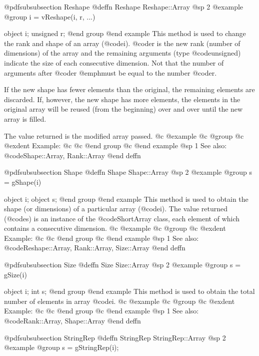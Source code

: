 @pdfsubsubsection {Reshape}
@deffn {Reshape} Reshape::Array
@sp 2
@example
@group
i = vReshape(i, r, ...)

object     i;
unsigned   r;
@end group
@end example
This method is used to change the rank and shape of an array (@code{i}).
@code{r} is the new rank (number of dimensions) of the array and
the remaining arguments (type @code{unsigned}) indicate the size of
each consecutive dimension.  Not that the number of arguments after
@code{r} @emph{must} be equal to the number @code{r}.

If the new shape has fewer elements than the original, the remaining
elements are discarded.  If, however, the new shape has more elements,
the elements in the original array will be reused (from the beginning)
over and over until the new array is filled.

The value returned is the modified array passed.
@c @example
@c @group
@c @exdent Example:
@c 
@c @end group
@c @end example
@sp 1
See also:  @code{Shape::Array, Rank::Array}
@end deffn







@pdfsubsubsection {Shape}
@deffn {Shape} Shape::Array
@sp 2
@example
@group
s = gShape(i)

object  i;
object  s;
@end group
@end example
This method is used to obtain the shape (or dimensions) of a particular
array (@code{i}).  The value returned (@code{s}) is an instance of the
@code{ShortArray} class, each element of which contains a consecutive
dimension.
@c @example
@c @group
@c @exdent Example:
@c 
@c @end group
@c @end example
@sp 1
See also:  @code{Reshape::Array, Rank::Array, Size::Array}
@end deffn








@pdfsubsubsection {Size}
@deffn {Size} Size::Array
@sp 2
@example
@group
s = gSize(i)

object  i;
int     s;
@end group
@end example
This method is used to obtain the total number of elements in array @code{i}.
@c @example
@c @group
@c @exdent Example:
@c 
@c @end group
@c @end example
@sp 1
See also:  @code{Rank::Array, Shape::Array}
@end deffn







@pdfsubsubsection {StringRep}
@deffn {StringRep} StringRep::Array
@sp 2
@example
@group
s = gStringRep(i);


